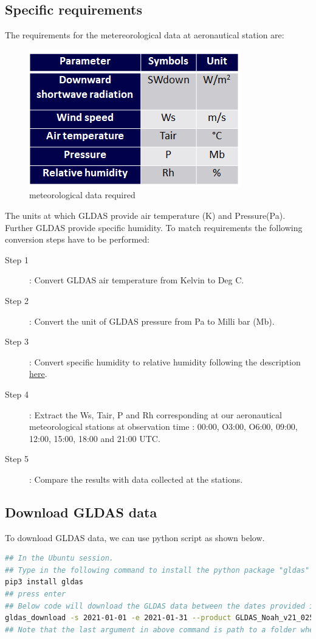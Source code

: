 \subsection{Specific requirements}
The requirements for the metereorological data at aeronautical station are:
\begin{figure}[H]
\begin{center}
\includegraphics[scale=0.8]{gldas1.png} %
\end{center}
\caption{meteorological data required}
\label{meteorological data required}%
\end{figure}
The units at which GLDAS provide air temperature (K) and Pressure(Pa). Further GLDAS provide specific humidity. 
To match requirements the following conversion steps have to be performed:
\begin{description}
\item[Step 1] : Convert GLDAS air temperature from Kelvin to Deg C.
\item[Step 2] : Convert the unit of GLDAS pressure from Pa to Milli bar (Mb).
\item[Step 3] : Convert specific humidity to relative humidity following the description \href{https://earthscience.stackexchange.com/questions/2360/how-do-i-convert-specific-humidity-to-relative-humidity/}{here}.
\item[Step 4] : Extract the Ws, Tair, P and Rh corresponding at our aeronautical meteorological stations at observation time : 00:00, O3:00, O6:00, 09:00, 12:00, 15:00, 18:00 and 21:00 UTC.
\item[Step 5] : Compare the results with data collected at the stations.
\end{description}
\subsection{Download GLDAS data}
To download GLDAS data, we can use python script as shown below.
\begin{lstlisting}[language=Bash]
## In the Ubuntu session.
## Type in the following command to install the python package "gldas"
pip3 install gldas
## press enter
## Below code will download the GLDAS data between the dates provided in the command.
gldas_download -s 2021-01-01 -e 2021-01-31 --product GLDAS_Noah_v21_025 --username nina.younkap --password ****** /mnt/path/to/folder
## Note that the last argument in above command is path to a folder where the downloaded files will be stored.
\end{lstlisting}
